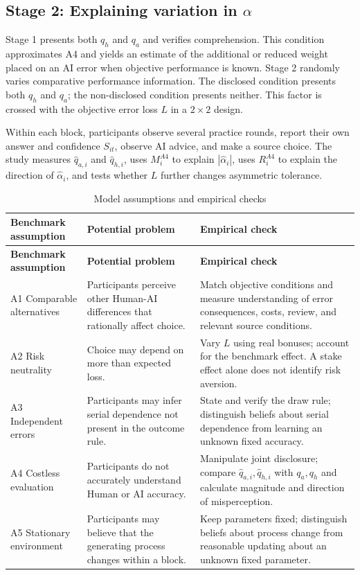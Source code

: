 \documentclass[11pt,a4paper]{article}
\begin{document}
\subsection{\texorpdfstring{Stage 2: Explaining variation in $\alpha$}{Stage 2: Explaining variation in alpha}}

Stage 1 presents both $q_h$ and $q_a$ and verifies comprehension. This condition approximates A4 and yields an estimate of the additional or reduced weight placed on an AI error when objective performance is known. Stage 2 randomly varies comparative performance information. The disclosed condition presents both $q_h$ and $q_a$; the non-disclosed condition presents neither. This factor is crossed with the objective error loss $L$ in a $2\times2$ design.

Within each block, participants observe several practice rounds, report their own answer and confidence $S_{it}$, observe AI advice, and make a source choice. The study measures $\widehat q_{a,i}$ and $\widehat q_{h,i}$, uses $M_i^{A4}$ to explain $|\widehat\alpha_i|$, uses $R_i^{A4}$ to explain the direction of $\widehat\alpha_i$, and tests whether $L$ further changes asymmetric tolerance.

\begin{longtable}{>{\RaggedRight\arraybackslash}p{}>{\RaggedRight\arraybackslash}p{}>{\RaggedRight\arraybackslash}p{}}
\caption{Model assumptions and empirical checks}\label{tab:assumptions}\\
\toprule
\textbf{Benchmark assumption} & \textbf{Potential problem} & \textbf{Empirical check}\\
\midrule
\endfirsthead
\toprule
\textbf{Benchmark assumption} & \textbf{Potential problem} & \textbf{Empirical check}\\
\midrule
\endhead
A1 Comparable alternatives & Participants perceive other Human-AI differences that rationally affect choice. & Match objective conditions and measure understanding of error consequences, costs, review, and relevant source conditions.\\
A2 Risk neutrality & Choice may depend on more than expected loss. & Vary $L$ using real bonuses; account for the benchmark effect. A stake effect alone does not identify risk aversion.\\
A3 Independent errors & Participants may infer serial dependence not present in the outcome rule. & State and verify the draw rule; distinguish beliefs about serial dependence from learning an unknown fixed accuracy.\\
A4 Costless evaluation & Participants do not accurately understand Human or AI accuracy. & Manipulate joint disclosure; compare $\widehat q_{a,i},\widehat q_{h,i}$ with $q_a,q_h$ and calculate magnitude and direction of misperception.\\
A5 Stationary environment & Participants may believe that the generating process changes within a block. & Keep parameters fixed; distinguish beliefs about process change from reasonable updating about an unknown fixed parameter.\\
\bottomrule
\end{longtable}
\end{document}
